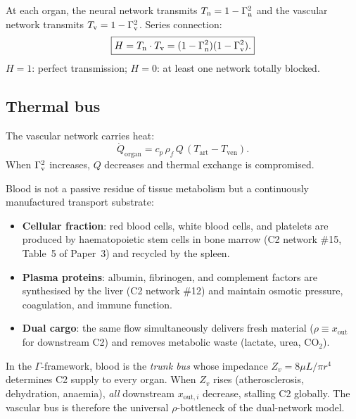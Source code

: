 \documentclass[aps,pre,twocolumn,superscriptaddress,floatfix]{revtex4-2}
\begin{document}
At each organ, the neural network transmits $T_{\text{n}} = 1-\Gamma_{\text{n}}^2$
and the vascular network transmits $T_{\text{v}} = 1-\Gamma_{\text{v}}^2$.
Series connection:
\begin{equation}
  \boxed{H = T_{\text{n}} \cdot T_{\text{v}} = (1-\Gamma_{\text{n}}^2)(1-\Gamma_{\text{v}}^2).}
  \label{eq:dual-health}
\end{equation}
$H=1$: perfect transmission; $H=0$: at least one
network totally blocked.

\subsection{Thermal bus}

The vascular network carries heat:
\begin{equation}
  \dot{Q}_{\text{organ}} = c_p\,\rho_f\,Q
    \,(T_{\text{art}} - T_{\text{ven}}).
  \label{eq:thermal-bus}
\end{equation}
When $\Gamma_{\text{v}}^2$ increases, $Q$ decreases and thermal
exchange is compromised.

\begin{remark}
\label{rem:blood-bus}
Blood is not a passive residue of tissue metabolism
but a continuously manufactured transport substrate:
\begin{itemize}
  \item \textbf{Cellular fraction}: red blood cells,
    white blood cells, and platelets are produced by
    haematopoietic stem cells in bone marrow
    (C2 network \#15, Table~5 of Paper~3)
    and recycled by the spleen.
  \item \textbf{Plasma proteins}: albumin, fibrinogen,
    and complement factors are synthesised by the liver
    (C2 network \#12) and maintain osmotic pressure,
    coagulation, and immune function.
  \item \textbf{Dual cargo}: the same flow simultaneously
    delivers fresh material
    ($\rho \equiv x_{\text{out}}$ for downstream C2)
    and removes metabolic waste (lactate, urea, CO$_2$).
\end{itemize}
In the $\Gamma$-framework, blood is the
\emph{trunk bus} whose impedance
$Z_v = 8\mu L/\pi r^4$ determines C2 supply to every
organ.
When $Z_v$ rises (atherosclerosis, dehydration,
anaemia), \emph{all} downstream
$x_{\text{out},i}$ decrease, stalling C2 globally.
The vascular bus is therefore the universal
$\rho$-bottleneck of the dual-network model.
\end{remark}
\end{document}
